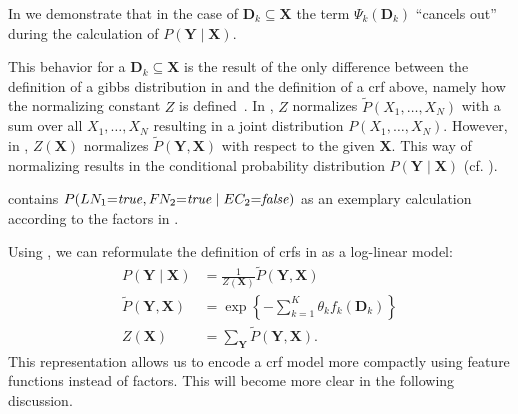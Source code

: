 In  we demonstrate that in the case of $\mathbf{D}_k\subseteq \mathbf{X}$ the term $\Psi_k(\mathbf{D}_k)$ ``cancels out'' during the calculation of $P(\mathbf{Y}\mid\mathbf{X})$.

This behavior for a $\mathbf{D}_k\subseteq\mathbf{X}$ is the result of the only difference between the definition of a \gls{gibbs distribution} in  and the definition of a \gls{crf} above, namely how the \gls{normalizing constant} $Z$ is defined~\citep{koller2009probabilistic}.
In , $Z$ normalizes $\tilde{P}(X_1,\dots,X_N)$ with a sum over all $X_1,\dots,X_N$ resulting in a \gls{joint distribution} $P(X_1,\dots,X_N)$.
However, in , $Z(\mathbf{X})$ normalizes $\tilde{P}(\mathbf{Y},\mathbf{X})$ with respect to the given $\mathbf{X}$.
This way of normalizing results in the \gls{conditional probability distribution} $P(\mathbf{Y}\mid\mathbf{X})$ (cf. ).

 contains $P(LN_1{=}\mathit{true},F\hspace{-0.07em} N_2{=}\mathit{true}\mid EC_2{=}\mathit{false})$ as an exemplary calculation according to the \glspl{factor} in .

\bigskip

Using , we can reformulate the definition of \glspl{crf} in  as a \gls{log-linear model}:
\begin{equation}
  \label{equ:crf-log-linear}
  \begin{split}
    P(\mathbf{Y}\mid\mathbf{X}) & = \frac{1}{Z(\mathbf{X})}\tilde{P}(\mathbf{Y},\mathbf{X}) \\
    \tilde{P}(\mathbf{Y},\mathbf{X}) & = \exp\left\{ -\sum_{k=1}^K \theta_k f_k\left(\mathbf{D}_k\right)\right\} \\
    Z(\mathbf{X}) & = \sum_{\mathbf{Y}}\tilde{P}(\mathbf{Y},\mathbf{X}).
  \end{split}
\end{equation}
This representation allows us to encode a \gls{crf} model more compactly using \glspl{feature function} instead of \glspl{factor}.
This will become more clear in the following discussion.

\bigskip

